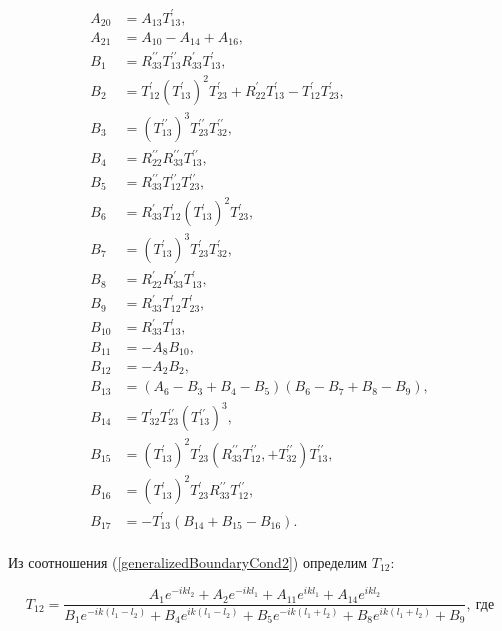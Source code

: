 \documentclass[a4 paper, 12 pt]{extarticle}
\begin{document}
   \[\begin{aligned}
   A_{20} &= A_{13} T_{13}^\prime, \\
   A_{21} &= A_{10} - A_{14} + A_{16}, \\
   B_1 &= R_{33}^{\prime\prime} T_{13}^{\prime\prime} R_{33}^\prime T_{13}^\prime,  \\
   B_2 &= T_{12}^\prime (T_{13}^\prime)^2 T_{23}^\prime + R_{22}^\prime T_{13}^\prime - T_{12}^\prime T_{23}^\prime, \\
   B_3 &= (T_{13}^{\prime\prime})^3 T_{23}^{\prime\prime} T_{32}^{\prime\prime},  \\
   B_4 &= R_{22}^{\prime\prime} R_{33}^{\prime\prime} T_{13}^{\prime\prime}, \\
   B_5 &= R_{33}^{\prime\prime} T_{12}^{\prime\prime} T_{23}^{\prime\prime}, \\
   B_6 &= R_{33}^\prime T_{12}^\prime (T_{13}^\prime)^2 T_{23}^\prime, \\
   B_7 &= (T_{13}^\prime)^3 T_{23}^\prime T_{32}^\prime, \\
   B_8 &= R_{22}^\prime R_{33}^\prime T_{13}^\prime, \\
   B_9 &= R_{33}^\prime T_{12}^\prime T_{23}^\prime, \\
   B_{10} &= R_{33}^\prime T_{13}^\prime, \\
   B_{11} &= -A_8 B_{10}, \\
   B_{12} &= -A_2 B_2, \\
   B_{13} &= (A_6 - B_3 + B_4 - B_5)(B_6-B_7+B_8-B_9), \\
   B_{14} &= T_{32}^\prime T_{23}^{\prime\prime}(T_{13}^{\prime\prime})^3, \\
   B_{15} &= (T_{13}^\prime)^2 T_{23}^\prime(R_{33}^{\prime\prime} T_{12}^{\prime\prime}, + T_{32}^{\prime\prime})T_{13}^{\prime\prime}, \\
   B_{16} &= (T_{13}^\prime)^2 T_{23}^\prime R_{33}^{\prime\prime} T_{12}^{\prime\prime}, \\
   B_{17} &= -T_{13}^\prime(B_{14}+B_{15}-B_{16}). \\
   \end{aligned}
   \]
   
   Из соотношения (\ref{generalizedBoundaryCond2}) определим $T_{12}$:
   
   
  \begin{equation}
   \label{T12}
   T_{12} = \frac {A_1 e^{-ikl_2} + A_2 e^{-ikl_1} + A_{11} e^{ikl_1} + A_{14} e^{ikl_2}}
   {B_1 e^{-ik\left(l_1-l_2\right)} + B_4 e^{ik\left(l_1-l_2\right)} + B_5 e^{-ik\left(l_1+l_2\right)} + B_8 e^{ik\left(l_1+l_2\right)} + B_9}, \ \text{где}
  \end{equation}
   
\end{document}
